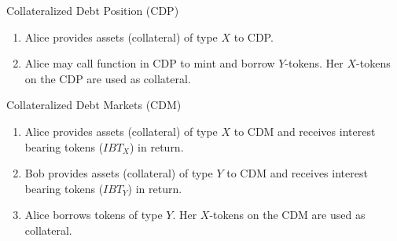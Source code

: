 \documentclass[handout]{beamer}
\begin{document}
\begin{frame}{Collateralized Debt Position (CDP)}

\vspace{-1em}

\begin{figure}[t]
	\centering
	\begin{tikzpicture}[scale=1.0, every node/.style={scale=1.0}]
		
	\end{tikzpicture}
\end{figure}


\small

\begin{enumerate}
	\item<2-> {Alice provides assets (collateral) of type $X$ to CDP.}
	\item<3-> {Alice may call function in CDP to mint and borrow $Y$-tokens. Her $X$-tokens on the CDP are used as collateral.}
\end{enumerate}

	
\end{frame}


\begin{frame}{Collateralized Debt Markets (CDM)}


\vspace{-1em}

\begin{figure}[t]
	\centering
	\begin{tikzpicture}[scale=1.0, every node/.style={scale=1.0}]
		
	\end{tikzpicture}
\end{figure}

\vspace{-1em}

\small

\begin{enumerate}
	\item<2-> {Alice provides assets (collateral) of type $X$ to CDM and receives interest bearing tokens ($IBT_X$) in return.}
	\item<3-> {Bob provides assets (collateral) of type $Y$ to CDM and receives interest bearing tokens ($IBT_Y$) in return.}
	\item<4-> {Alice borrows tokens of type $Y$. Her $X$-tokens on the CDM are used as collateral.}
\end{enumerate}

	
\end{frame}
\end{document}
